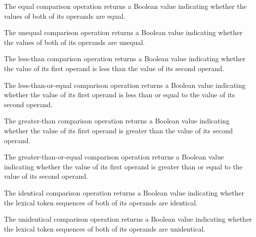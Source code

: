 \begin{itemize}


The equal comparison operation returns a Boolean value indicating whether the values of both of its operands are equal.


The unequal comparison operation returns a Boolean value indicating whether the values of both of its operands are unequal.


The less-than comparison operation returns a Boolean value indicating whether the value of its first operand is less than the value of its second operand.


The less-than-or-equal comparison operation returns a Boolean value indicating whether the value of its first operand is less than or equal to the value of its second operand.


The greater-than comparison operation returns a Boolean value indicating whether the value of its first operand is greater than the value of its second operand.


The greater-than-or-equal comparison operation returns a Boolean value indicating whether the value of its first operand is greater than or equal to the value of its second operand.


The identical comparison operation returns a Boolean value indicating whether the lexical token sequences of both of its operands are identical.


The unidentical comparison operation returns a Boolean value indicating whether the lexical token sequences of both of its operands are unidentical.

\end{itemize}

